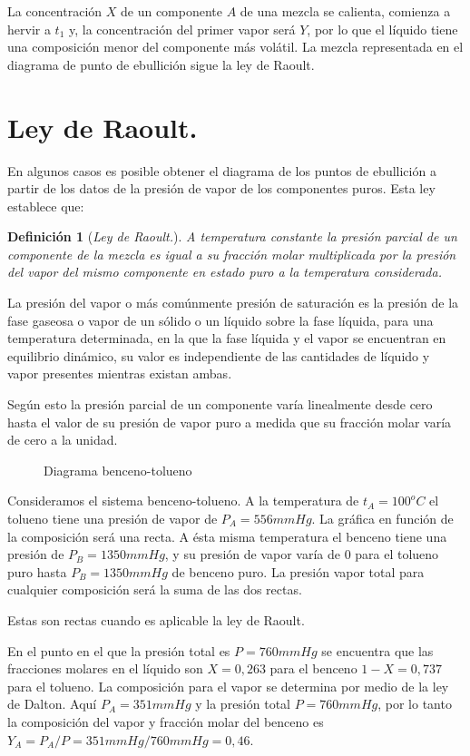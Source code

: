 \documentclass[11pt,openany]{book}
\newtheorem{defi}{Definición}
\begin{document}
La concentración $X$ de un componente $A$ de una mezcla se calienta, comienza a hervir a $t_1$ y, la 
concentración del primer vapor será $Y$, por lo que el líquido tiene una composición menor del componente más volátil.
La mezcla representada en el diagrama de punto de ebullición sigue la ley de Raoult.

\section{Ley de Raoult.}

En algunos casos es posible obtener el diagrama de los puntos de ebullición a partir de los datos de
 la presión de vapor de los componentes puros. Esta ley establece que: 
\begin{defi}[\textit{Ley de Raoult.}]
 A temperatura constante la presión parcial de un componente de la mezcla es igual a su fracción molar multiplicada por la 
 presión del vapor del mismo componente en estado puro a la temperatura considerada.
\end{defi}
 La presión del vapor o más comúnmente presión de saturación es la presión de la fase gaseosa o 
 vapor de un sólido o un líquido sobre la fase líquida, para una temperatura determinada, en la que 
 la fase líquida y el vapor se encuentran en equilibrio dinámico, su valor es independiente de las 
 cantidades de líquido y vapor presentes mientras existan ambas.

 Según esto la presión parcial de un componente varía linealmente desde cero hasta el valor de su 
 presión de vapor puro a medida que su fracción molar varía de cero a la unidad.

 \begin{figure}[h]
  \centering
  
  \caption{Diagrama benceno-tolueno}  
\end{figure}
  
 Consideramos el sistema benceno-tolueno. A la temperatura de $t_A=100^oC$ el tolueno tiene una presión 
 de vapor de $P_A=556mmHg$. La gráfica en función de la composición será una recta. A ésta misma 
 temperatura el benceno tiene una presión de $P_B=1350 mmHg$, y su presión de vapor varía de 0 para el
  tolueno puro hasta $P_B=1350 mmHg$ de benceno puro. La presión vapor total para cualquier composición será 
  la suma de las dos rectas.

  Estas son rectas cuando es aplicable la ley de Raoult.

  En el punto en el que la presión total es $P=760 mmHg$ se encuentra que las fracciones molares en 
  el líquido son $X=0,263$ para el benceno $1-X=0,737$ para el tolueno. La composición para el vapor se 
  determina por medio de la ley de Dalton. Aquí $P_A=351 mmHg$ y la presión total $P=760 mmHg$, por lo tanto la 
  composición del vapor y fracción molar del benceno es $Y_A=P_A/P=351mmHg/760mmHg=0,46$.
  
\end{document}
